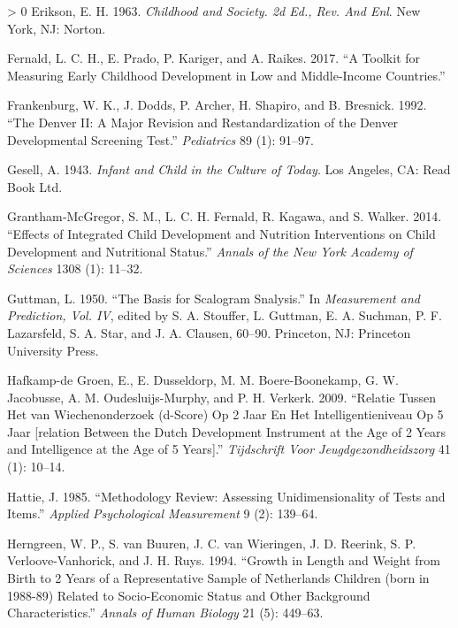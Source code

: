 \documentclass[
]{book}
\newlength{\cslhangindent}
\newenvironment{CSLReferences}[3] %
 {%
  \setlength{\parindent}{0pt}
  \ifodd #1 \everypar{\setlength{\hangindent}{\cslhangindent}}\ignorespaces\fi
  \ifnum #2 > 0
  \setlength{\parskip}{#2\baselineskip}
  \fi
 }%
 {}
\begin{document}
\begin{CSLReferences}{1}{0}
\leavevmode\hypertarget{ref-erikson1963}{}%
Erikson, E. H. 1963. \emph{Childhood and Society. 2d Ed., Rev. And Enl}. New York, NJ: Norton.

\leavevmode\hypertarget{ref-fernald2017toolkit}{}%
Fernald, L. C. H., E. Prado, P. Kariger, and A. Raikes. 2017. {``A Toolkit for Measuring Early Childhood Development in Low and Middle-Income Countries.''}

\leavevmode\hypertarget{ref-frankenburg1992}{}%
Frankenburg, W. K., J. Dodds, P. Archer, H. Shapiro, and B. Bresnick. 1992. {``The Denver II: A Major Revision and Restandardization of the Denver Developmental Screening Test.''} \emph{Pediatrics} 89 (1): 91--97.

\leavevmode\hypertarget{ref-gesell1943}{}%
Gesell, A. 1943. \emph{Infant and Child in the Culture of Today}. Los Angeles, CA: Read Book Ltd.

\leavevmode\hypertarget{ref-grantham2014}{}%
Grantham‐McGregor, S. M., L. C. H. Fernald, R. Kagawa, and S. Walker. 2014. {``Effects of Integrated Child Development and Nutrition Interventions on Child Development and Nutritional Status.''} \emph{Annals of the New York Academy of Sciences} 1308 (1): 11--32.

\leavevmode\hypertarget{ref-guttman1950}{}%
Guttman, L. 1950. {``The Basis for Scalogram Snalysis.''} In \emph{Measurement and Prediction, Vol. IV}, edited by S. A. Stouffer, L. Guttman, E. A. Suchman, P. F. Lazarsfeld, S. A. Star, and J. A. Clausen, 60--90. Princeton, NJ: Princeton University Press.

\leavevmode\hypertarget{ref-hafkamp2009}{}%
Hafkamp-de Groen, E., E. Dusseldorp, M. M. Boere-Boonekamp, G. W. Jacobusse, A. M. Oudesluijs-Murphy, and P. H. Verkerk. 2009. {``Relatie Tussen Het van Wiechenonderzoek (d-Score) Op 2 Jaar En Het Intelligentieniveau Op 5 Jaar {[}relation Between the Dutch Development Instrument at the Age of 2 Years and Intelligence at the Age of 5 Years{]}.''} \emph{Tijdschrift Voor Jeugdgezondheidszorg} 41 (1): 10--14.

\leavevmode\hypertarget{ref-hattie1985}{}%
Hattie, J. 1985. {``Methodology Review: Assessing Unidimensionality of Tests and Items.''} \emph{Applied Psychological Measurement} 9 (2): 139--64.

\leavevmode\hypertarget{ref-herngreen1994}{}%
Herngreen, W. P., S. van Buuren, J. C. van Wieringen, J. D. Reerink, S. P. Verloove-Vanhorick, and J. H. Ruys. 1994. {``Growth in Length and Weight from Birth to 2 Years of a Representative Sample of Netherlands Children (born in 1988-89) Related to Socio-Economic Status and Other Background Characteristics.''} \emph{Annals of Human Biology} 21 (5): 449--63.


\end{CSLReferences}
\end{document}
